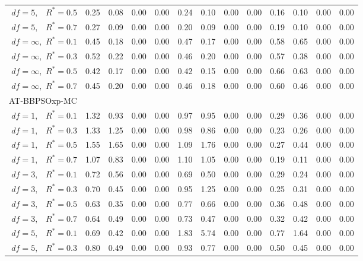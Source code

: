 \documentclass[12pt]{article}
\begin{document}
\begin{table}[ht]
{\begin{tabular}{r|rrrr|rrrr|rrrr}
  $df = 5,\enspace$ $R^* =0.5$ & 0.25 & 0.08 & 0.00 & 0.00 & 0.24 & 0.10 & 0.00 & 0.00 & 0.16 & 0.10 & 0.00 & 0.00 \\ 
  $df = 5,\enspace$ $R^* =0.7$ & 0.27 & 0.09 & 0.00 & 0.00 & 0.20 & 0.09 & 0.00 & 0.00 & 0.19 & 0.10 & 0.00 & 0.00 \\ 
  $df = \infty,$ $R^* =0.1$ & 0.45 & 0.18 & 0.00 & 0.00 & 0.47 & 0.17 & 0.00 & 0.00 & 0.58 & 0.65 & 0.00 & 0.00 \\ 
  $df = \infty,$ $R^* =0.3$ & 0.52 & 0.22 & 0.00 & 0.00 & 0.46 & 0.20 & 0.00 & 0.00 & 0.57 & 0.38 & 0.00 & 0.00 \\ 
  $df = \infty,$ $R^* =0.5$ & 0.42 & 0.17 & 0.00 & 0.00 & 0.42 & 0.15 & 0.00 & 0.00 & 0.66 & 0.63 & 0.00 & 0.00 \\ 
  $df = \infty,$ $R^* =0.7$ & 0.45 & 0.20 & 0.00 & 0.00 & 0.46 & 0.18 & 0.00 & 0.00 & 0.60 & 0.46 & 0.00 & 0.00 \\ 
\hline
\multicolumn{1}{l|}{AT-BBPSOxp-MC} &&&&&&&&&&&&\\
  $df = 1,\enspace$ $R^* =0.1$ & 1.32 & 0.93 & 0.00 & 0.00 & 0.97 & 0.95 & 0.00 & 0.00 & 0.29 & 0.36 & 0.00 & 0.00 \\ 
  $df = 1,\enspace$ $R^* =0.3$ & 1.33 & 1.25 & 0.00 & 0.00 & 0.98 & 0.86 & 0.00 & 0.00 & 0.23 & 0.26 & 0.00 & 0.00 \\ 
  $df = 1,\enspace$ $R^* =0.5$ & 1.55 & 1.65 & 0.00 & 0.00 & 1.09 & 1.76 & 0.00 & 0.00 & 0.27 & 0.44 & 0.00 & 0.00 \\ 
  $df = 1,\enspace$ $R^* =0.7$ & 1.07 & 0.83 & 0.00 & 0.00 & 1.10 & 1.05 & 0.00 & 0.00 & 0.19 & 0.11 & 0.00 & 0.00 \\ 
  $df = 3,\enspace$ $R^* =0.1$ & 0.72 & 0.56 & 0.00 & 0.00 & 0.69 & 0.50 & 0.00 & 0.00 & 0.29 & 0.24 & 0.00 & 0.00 \\ 
  $df = 3,\enspace$ $R^* =0.3$ & 0.70 & 0.45 & 0.00 & 0.00 & 0.95 & 1.25 & 0.00 & 0.00 & 0.25 & 0.31 & 0.00 & 0.00 \\ 
  $df = 3,\enspace$ $R^* =0.5$ & 0.63 & 0.35 & 0.00 & 0.00 & 0.77 & 0.66 & 0.00 & 0.00 & 0.36 & 0.48 & 0.00 & 0.00 \\ 
  $df = 3,\enspace$ $R^* =0.7$ & 0.64 & 0.49 & 0.00 & 0.00 & 0.73 & 0.47 & 0.00 & 0.00 & 0.32 & 0.42 & 0.00 & 0.00 \\ 
  $df = 5,\enspace$ $R^* =0.1$ & 0.69 & 0.42 & 0.00 & 0.00 & 1.83 & 5.74 & 0.00 & 0.00 & 0.77 & 1.64 & 0.00 & 0.00 \\ 
  $df = 5,\enspace$ $R^* =0.3$ & 0.80 & 0.49 & 0.00 & 0.00 & 0.93 & 0.77 & 0.00 & 0.00 & 0.50 & 0.45 & 0.00 & 0.00 \\ 

\end{tabular}}
\end{table}
\end{document}
